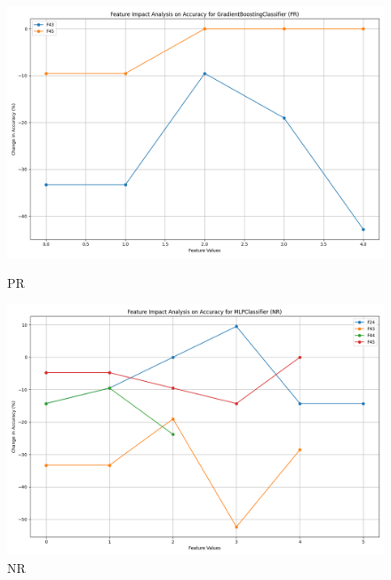 \begin{figure}[H]
    \centering
    \begin{minipage}{0.495\textwidth}
        \centering
        \includegraphics[width=\linewidth]{analysis/images/feature_impact_accuracy_PR_GradientBoostingClassifier.png}
        \caption{PR}
        \label{fig:pr_accuracy_analysis}
    \end{minipage}\hfill
    \begin{minipage}{0.495\textwidth}
        \centering
        \includegraphics[width=\linewidth]{analysis/images/feature_impact_accuracy_NR_MLPClassifier.png}
        \caption{NR}
        \label{fig:nr_accuracy_analysis}
    \end{minipage}
\end{figure}

